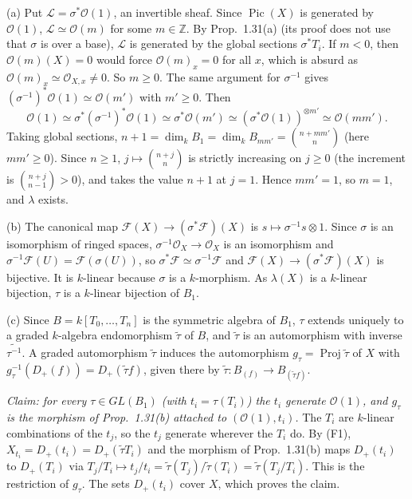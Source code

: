 \documentclass[11pt]{article}
\begin{document}
(a) Put $\mathcal{L}=\sigma^*\mathcal{O}(1)$, an invertible sheaf. Since $\operatorname{Pic}(X)$ is generated by $\mathcal{O}(1)$, $\mathcal{L}\simeq\mathcal{O}(m)$ for some $m\in\mathbb{Z}$. By Prop.~1.31(a) (its proof does not use that $\sigma$ is over a base), $\mathcal{L}$ is generated by the global sections $\sigma^*T_i$. If $m<0$, then $\mathcal{O}(m)(X)=0$ would force $\mathcal{O}(m)_x=0$ for all $x$, which is absurd as $\mathcal{O}(m)_x\simeq\mathcal{O}_{X,x}\ne0$. So $m\ge0$. The same argument for $\sigma^{-1}$ gives $(\sigma^{-1})^*\mathcal{O}(1)\simeq\mathcal{O}(m')$ with $m'\ge0$. Then
\[ \mathcal{O}(1)\simeq\sigma^*(\sigma^{-1})^*\mathcal{O}(1)\simeq\sigma^*\mathcal{O}(m')\simeq(\sigma^*\mathcal{O}(1))^{\otimes m'}\simeq\mathcal{O}(mm'). \]
Taking global sections, $n+1=\dim_kB_1=\dim_kB_{mm'}=\binom{n+mm'}{n}$ (here $mm'\ge0$). Since $n\ge1$, $j\mapsto\binom{n+j}{n}$ is strictly increasing on $j\ge0$ (the increment is $\binom{n+j}{n-1}>0$), and takes the value $n+1$ at $j=1$. Hence $mm'=1$, so $m=1$, and $\lambda$ exists.

(b) The canonical map $\mathcal{F}(X)\to(\sigma^*\mathcal{F})(X)$ is $s\mapsto\sigma^{-1}s\otimes1$. Since $\sigma$ is an isomorphism of ringed spaces, $\sigma^{-1}\mathcal{O}_X\to\mathcal{O}_X$ is an isomorphism and $\sigma^{-1}\mathcal{F}(U)=\mathcal{F}(\sigma(U))$, so $\sigma^*\mathcal{F}\simeq\sigma^{-1}\mathcal{F}$ and $\mathcal{F}(X)\to(\sigma^*\mathcal{F})(X)$ is bijective. It is $k$-linear because $\sigma$ is a $k$-morphism. As $\lambda(X)$ is a $k$-linear bijection, $\tau$ is a $k$-linear bijection of $B_1$.

(c) Since $B=k[T_0,\dots,T_n]$ is the symmetric algebra of $B_1$, $\tau$ extends uniquely to a graded $k$-algebra endomorphism $\tilde\tau$ of $B$, and $\tilde\tau$ is an automorphism with inverse $\widetilde{\tau^{-1}}$. A graded automorphism $\tilde\tau$ induces the automorphism $g_\tau=\operatorname{Proj}\tilde\tau$ of $X$ with $g_\tau^{-1}(D_+(f))=D_+(\tilde\tau f)$, given there by $\tilde\tau:B_{(f)}\to B_{(\tilde\tau f)}$.

\emph{Claim: for every $\tau\in GL(B_1)$ (with $t_i=\tau(T_i)$) the $t_i$ generate $\mathcal{O}(1)$, and $g_\tau$ is the morphism of Prop.~1.31(b) attached to $(\mathcal{O}(1),t_i)$.} The $T_i$ are $k$-linear combinations of the $t_j$, so the $t_j$ generate wherever the $T_i$ do. By (F1), $X_{t_i}=D_+(t_i)=D_+(\tilde\tau T_i)$ and the morphism of Prop.~1.31(b) maps $D_+(t_i)$ to $D_+(T_i)$ via $T_j/T_i\mapsto t_j/t_i=\tilde\tau(T_j)/\tilde\tau(T_i)=\tilde\tau(T_j/T_i)$. This is the restriction of $g_\tau$. The sets $D_+(t_i)$ cover $X$, which proves the claim.
\end{document}
